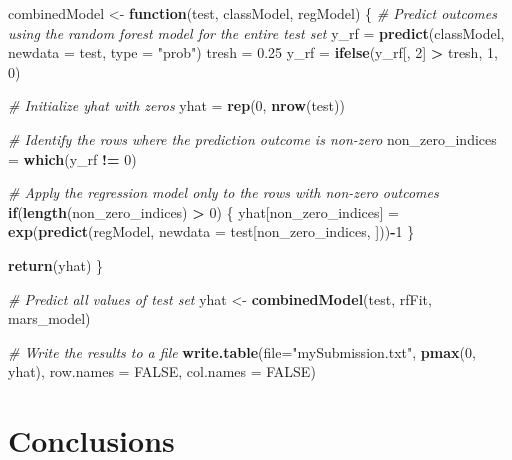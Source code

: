 \documentclass[
]{article}
\newenvironment{Shaded}{\begin{snugshade}}{\end{snugshade}}
\newcommand{\AttributeTok}[1]{\textcolor[rgb]{0.13,0.29,0.53}{#1}}
\newcommand{\CommentTok}[1]{\textcolor[rgb]{0.56,0.35,0.01}{\textit{#1}}}
\newcommand{\ConstantTok}[1]{\textcolor[rgb]{0.56,0.35,0.01}{#1}}
\newcommand{\ControlFlowTok}[1]{\textcolor[rgb]{0.13,0.29,0.53}{\textbf{#1}}}
\newcommand{\DecValTok}[1]{\textcolor[rgb]{0.00,0.00,0.81}{#1}}
\newcommand{\FloatTok}[1]{\textcolor[rgb]{0.00,0.00,0.81}{#1}}
\newcommand{\FunctionTok}[1]{\textcolor[rgb]{0.13,0.29,0.53}{\textbf{#1}}}
\newcommand{\NormalTok}[1]{#1}
\newcommand{\OtherTok}[1]{\textcolor[rgb]{0.56,0.35,0.01}{#1}}
\newcommand{\SpecialCharTok}[1]{\textcolor[rgb]{0.81,0.36,0.00}{\textbf{#1}}}
\newcommand{\StringTok}[1]{\textcolor[rgb]{0.31,0.60,0.02}{#1}}
\begin{document}
\begin{Shaded}
\begin{Highlighting}[]
\NormalTok{combinedModel }\OtherTok{\textless{}{-}} \ControlFlowTok{function}\NormalTok{(test, classModel, regModel) \{}
  \CommentTok{\# Predict outcomes using the random forest model for the entire test set}
\NormalTok{  y\_rf }\OtherTok{=} \FunctionTok{predict}\NormalTok{(classModel, }\AttributeTok{newdata =}\NormalTok{ test, }\AttributeTok{type =} \StringTok{"prob"}\NormalTok{)}
\NormalTok{  tresh }\OtherTok{=} \FloatTok{0.25} 
\NormalTok{  y\_rf }\OtherTok{=} \FunctionTok{ifelse}\NormalTok{(y\_rf[, }\DecValTok{2}\NormalTok{] }\SpecialCharTok{\textgreater{}}\NormalTok{ tresh, }\DecValTok{1}\NormalTok{, }\DecValTok{0}\NormalTok{)}

  \CommentTok{\# Initialize yhat with zeros}
\NormalTok{  yhat }\OtherTok{=} \FunctionTok{rep}\NormalTok{(}\DecValTok{0}\NormalTok{, }\FunctionTok{nrow}\NormalTok{(test))}
  
  \CommentTok{\# Identify the rows where the prediction outcome is non{-}zero}
\NormalTok{  non\_zero\_indices }\OtherTok{=} \FunctionTok{which}\NormalTok{(y\_rf }\SpecialCharTok{!=} \DecValTok{0}\NormalTok{)}
  
  \CommentTok{\# Apply the regression model only to the rows with non{-}zero outcomes}
  \ControlFlowTok{if}\NormalTok{(}\FunctionTok{length}\NormalTok{(non\_zero\_indices) }\SpecialCharTok{\textgreater{}} \DecValTok{0}\NormalTok{) \{}
\NormalTok{    yhat[non\_zero\_indices] }\OtherTok{=} \FunctionTok{exp}\NormalTok{(}\FunctionTok{predict}\NormalTok{(regModel, }\AttributeTok{newdata =}\NormalTok{ test[non\_zero\_indices, ]))}\SpecialCharTok{{-}}\DecValTok{1}
\NormalTok{  \}}
  
  \FunctionTok{return}\NormalTok{(yhat)}
\NormalTok{\}}

\CommentTok{\# Predict all values of test set}
\NormalTok{yhat }\OtherTok{\textless{}{-}} \FunctionTok{combinedModel}\NormalTok{(test, rfFit, mars\_model)}

\CommentTok{\# Write the results to a file}
\FunctionTok{write.table}\NormalTok{(}\AttributeTok{file=}\StringTok{"mySubmission.txt"}\NormalTok{, }\FunctionTok{pmax}\NormalTok{(}\DecValTok{0}\NormalTok{, yhat), }\AttributeTok{row.names =} \ConstantTok{FALSE}\NormalTok{, }\AttributeTok{col.names =} \ConstantTok{FALSE}\NormalTok{)}
\end{Highlighting}
\end{Shaded}

\hypertarget{conclusions}{%
\section{Conclusions}\label{conclusions}}
\end{document}
